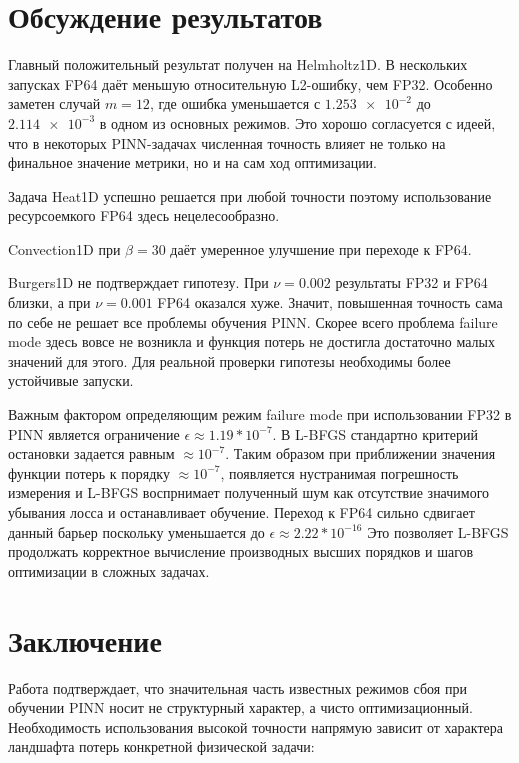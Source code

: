 \documentclass[14pt,a4paper]{extarticle}
\begin{document}
\section{Обсуждение результатов}

Главный положительный результат получен на Helmholtz1D. В нескольких запусках FP64 даёт меньшую относительную L2-ошибку, чем FP32. Особенно заметен случай $m=12$, где ошибка уменьшается с $\num{1.253e-2}$ до $\num{2.114e-3}$ в одном из основных режимов. Это хорошо согласуется с идеей, что в некоторых PINN-задачах численная точность влияет не только на финальное значение метрики, но и на сам ход оптимизации.

Задача Heat1D успешно решается при любой точности поэтому использование ресурсоемкого FP64 здесь нецелесообразно.

Convection1D при $\beta=30$ даёт умеренное улучшение при переходе к FP64.

Burgers1D не подтверждает гипотезу. При $\nu=0.002$ результаты FP32 и FP64 близки, а при $\nu=0.001$ FP64 оказался хуже. Значит, повышенная точность сама по себе не решает все проблемы обучения PINN. Скорее всего проблема failure mode здесь вовсе не возникла и функция потерь не достигла достаточно малых значений для этого. Для реальной проверки гипотезы необходимы более устойчивые запуски.

Важным фактором определяющим режим failure mode при использовании FP32 в PINN является ограничение $\epsilon\approx1.19*10^{-7}$. В L-BFGS стандартно критерий остановки задается равным $\approx 10^{-7}$. Таким образом при приближении значения функции потерь к порядку $\approx10^{-7}$, появляется нустранимая погрешность измерения и L-BFGS воспрнимает полученный шум как отсутствие значимого убывания лосса и останавливает обучение. Переход к FP64 сильно сдвигает данный барьер поскольку уменьшается до $\epsilon \approx 2.22 * 10^{-16}$ Это позволяет L-BFGS продолжать корректное вычисление производных высших порядков и шагов оптимизации в сложных задачах.


\section{Заключение}

Работа подтверждает, что значительная часть известных режимов сбоя при обучении PINN носит не структурный характер, а чисто оптимизационный. Необходимость использования высокой точности напрямую зависит от характера ландшафта потерь конкретной физической задачи:
\end{document}
